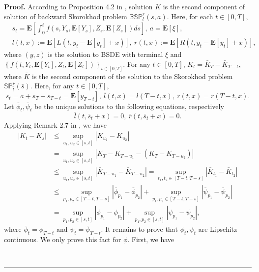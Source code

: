 \documentclass[10pt]{article}%
\numberwithin{equation}{section}
\newenvironment{proof}[1][Proof]{\noindent \textbf{#1.} }{\  \rule{0.5em}{0.5em}}
\def \E{\mathbf{E}}
\begin{document}
\begin{proof}
    According to Proposition 4.2 in \cite{L}, solution $K$ is the second component of solution of backward Skorokhod problem $\mathbb{BSP}_{l}^{r}(s,a)$. Here, for each $t\in[0,T]$,
\begin{equation}\begin{split}
&s_t=\mathbf{E}\left[\int_{0}^{t}f(s,Y_s,\mathbf{E}[Y_s],Z_s,\mathbf{E}[Z_s])ds\right],\ a=\mathbf{E}[\xi],\\
&l(t,x):=\mathbf{E}\left[L(t,y_t-\E[y_t]+x)\right], \ r(t,x):=\mathbf{E}\left[R(t,y_t-\E[y_t]+x)\right], 
\end{split}
 \end{equation}
where $(y,z)$ is the solution to  BSDE with terminal $\xi$ and $\left\{f(t,Y_t,\mathbf{E}[Y_t],Z_t,\mathbf{E}[Z_t])\right\}_{t\in[0,T]}$. 
For any $t\in[0,T]$, $K_t=\bar{K}_T-\bar{K}_{T-t}$, where $\bar{K}$ is the second component of the solution to the Skorokhod problem $\mathbb{SP}_{\bar{l}}^{\bar{r}}(\bar{s})$. Here, for any $t\in[0,T]$, 
\begin{equation}
\bar{s}_{t}=a+s_{T}-s_{T-t}=\mathbf{E}[y_{T-t}],\ \bar{l}(t,x)=l (T-t,x), \ \bar{r}(t,x)=r(T-t,x).
\end{equation}
Let {$\bar{\phi}_{t}, \bar{\psi}_{t}$}  be the unique solutions to the following equations, respectively
$$\bar{l}(t,\bar{s}_t+x)=0, \ \bar{r}(t,\bar{s}_t+x)=0.$$
Applying Remark 2.7 in \cite{Li}, we have 
\begin{equation}
\begin{split}
   \left|K_t-K_s\right|&\leq \sup_{u_1,u_2\in[s,t]}\left|K_{u_1}-K_{u_2}\right|\\
   &=\sup_{u_1,u_2\in[s,t]}\left|\bar{K}_T-\bar{K}_{T-u_1}-(\bar{K}_T-\bar{K}_{T-u_2})\right|\\
   &\leq \sup_{u_1,u_2\in[s,t]}\left|\bar{K}_{T-u_1}-\bar{K}_{T-u_2}\right|=\sup_{t_1,t_2\in[T-t,T-s]}\left|\bar{K}_{t_1}-\bar{K}_{t_2}\right|\\
   &\leq \sup_{p_1,p_2\in[T-t,T-s]}\left|\bar{\phi}_{p_1}-\bar{\phi}_{p_2}\right|+\sup_{p_1,p_2\in[T-t,T-s]}\left|\bar{\psi}_{p_1}-\bar{\psi}_{p_2}\right|\\
   &{= \sup_{p_1,p_2\in[s,t]}\left|{\phi}_{p_1}-{\phi}_{p_2}\right|+\sup_{p_1,p_2\in[s,t]}\left|{\psi}_{p_1}-{\psi}_{p_2}\right|},
\end{split}    
\end{equation}
where $\bar{\phi}_t=\phi_{T-t}$ and ${\psi}_t=\bar{\psi}_{T-t}$. It remains to prove that $\phi_t,\psi_t$ are Lipschitz continuous. We only prove this fact for $\phi$. First, we have

\end{proof}
\end{document}
